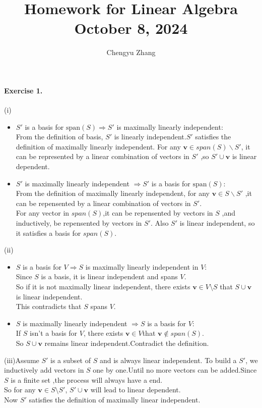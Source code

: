 \documentclass{article}
\title{\vspace*{-3.5cm}Homework for Linear Algebra \\October 8, 2024}
\author{Chengyu Zhang}
\date{}
\begin{document}
\maketitle

\paragraph{Exercise 1.}
(i)
\begin{itemize}
\item$S'$ is a basis for $\text{span}(S) \Rightarrow S'$ is maximally linearly independent:\\
From the definition of basis, $S'$ is linearly independent.$S'$ satisfies the definition of maximally linearly independent.
For any $\mathbf{v} \in span(S)\backslash S'$, it can be represented by a linear combination of vectors in $S'$ ,so $S' \cup \mathbf{v}$ is linear dependent. 
\item $S'$ is maximally linearly independent $\Rightarrow S'$ is a basis for $\text{span}(S)$: \\
From the definition of maximally linearly independent, for any $\mathbf{v} \in S\backslash S'$ ,it can be repensented by a linear combination of vectors in $S'$.\\
For any vector in $span(S)$,it can be repensented by vectors in $S$ ,and inductively, be repensented by vectors in $S'$. Also $S'$ is linear independent, so it satisfies a basis for $span(S)$.
\end{itemize}

(ii)
\begin{itemize}
    \item$S$ is a basis for $V \Rightarrow S$ is maximally linearly independent in $V$:\\
    Since $S$ is a basis, it is linear independent and spans $V$.\\
    So if it is not maximally linear independent, there exists $\mathbf{v} \in V \setminus S$ that $S\cup \mathbf{v}$ is linear independent.\\
    This contradicts that $S$ spans $V$.\\
    \item $S$ is maximally linearly independent $\Rightarrow S$ is a basis for $V$: \\
    If $S$ isn't a basis for $V$, there exists $ \mathbf{v} \in V $that $\mathbf{v} \notin span(S)$.\\
    So $ S\cup \mathbf{v}$ remains linear independent.Contradict the definition.
    \end{itemize}
(iii)Assume $S'$ is a subset of $S$ and is always linear independent. To build a $S'$, we inductively add vectors in $S$ one by one.Until no more vectors can be added.Since $S$ is a finite set ,the process will always have a end.\\
So for any $\mathbf{v} \in S \setminus S'$, $S'\cup \mathbf{v}$ will lead to linear dependent.\\
Now $S'$ satisfies the definition of maximally linear independent.
\end{document}
